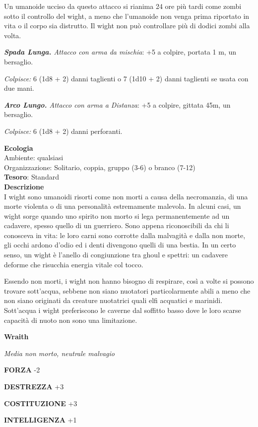 \begin{multicols}{2}
	Un umanoide ucciso da questo attacco si rianima 24 ore più tardi come zombi sotto il controllo del wight, a meno che l'umanoide non venga prima riportato in vita o il corpo sia distrutto. Il wight non può controllare più di dodici zombi alla volta.

	\textit{\textbf{Spada Lunga.} Attacco con arma da mischia}: +5 a colpire, portata 1 m, un bersaglio.

	\textit{Colpisce:} 6 (1d8 + 2) danni taglienti o 7 (1d10 + 2) danni taglienti se usata con due mani.

	\textit{\textbf{Arco Lungo.} Attacco con arma a Distanza}: +5 a colpire, gittata 45m, un bersaglio.

	\textit{Colpisce:} 6 (1d8 + 2) danni perforanti.

	\textbf{Ecologia}\\
	Ambiente: qualsiasi\\
	Organizzazione: Solitario, coppia, gruppo (3-6) o branco (7-12)\\
	\textbf{Tesoro}: Standard\\
	\textbf{Descrizione}\\
	I wight sono umanoidi risorti come non morti a causa della necromanzia, di una morte violenta o di una personalità estremamente malevola. In alcuni casi, un wight sorge quando uno spirito non morto si lega permanentemente ad un cadavere, spesso quello di un guerriero. Sono appena riconoscibili da chi li conosceva in vita: le loro carni sono corrotte dalla malvagità e dalla non morte, gli occhi ardono d'odio ed i denti divengono quelli di una bestia. In un certo senso, un wight è l'anello di congiunzione tra ghoul e spettri: un cadavere deforme che risucchia energia vitale col tocco.

	Essendo non morti, i wight non hanno bisogno di respirare, così a volte si possono trovare sott'acqua, sebbene non siano nuotatori particolarmente abili a meno che non siano originati da creature nuotatrici quali elfi acquatici e marinidi. Sott'acqua i wight preferiscono le caverne dal soffitto basso dove le loro scarse capacità di nuoto non sono una limitazione.

	\medskip{}\textbf{Wraith}

	\textit{Media non morto, neutrale malvagio}

	\textbf{FORZA} -2

	\textbf{DESTREZZA} +3

	\textbf{COSTITUZIONE} +3

	\textbf{INTELLIGENZA} +1


\end{multicols}

